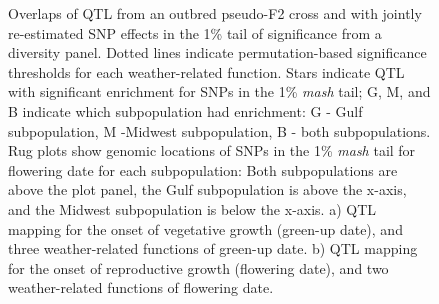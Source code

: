\documentclass[
  9pt,
  twocolumn,
  twoside]{pnas-new}
\begin{document}
\begin{figure}


\caption{\label{fig-qtl}Overlaps of QTL from an outbred pseudo-F2 cross
and with jointly re-estimated SNP effects in the 1\% tail of
significance from a diversity panel. Dotted lines indicate
permutation-based significance thresholds for each weather-related
function. Stars indicate QTL with significant enrichment for SNPs in the
1\% \emph{mash} tail; G, M, and B indicate which subpopulation had
enrichment: G - Gulf subpopulation, M -Midwest subpopulation, B - both
subpopulations. Rug plots show genomic locations of SNPs in the 1\%
\emph{mash} tail for flowering date for each subpopulation: Both
subpopulations are above the plot panel, the Gulf subpopulation is above
the x-axis, and the Midwest subpopulation is below the x-axis. a) QTL
mapping for the onset of vegetative growth (green-up date), and three
weather-related functions of green-up date. b) QTL mapping for the onset
of reproductive growth (flowering date), and two weather-related
functions of flowering date.}

\end{figure}%
\end{document}
